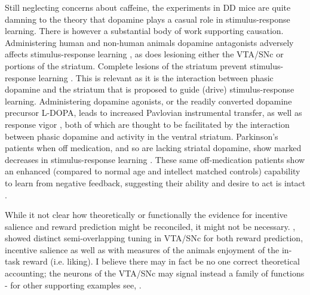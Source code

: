 \documentclass[doc,12pt]{apa}        %
\begin{document}
Still neglecting concerns about caffeine, the experiments in DD mice are quite damning to the theory that dopamine plays a casual role in stimulus-response learning.  There is however a substantial body of work supporting causation.  Administering human and non-human animals dopamine antagonists adversely affects stimulus-response learning \cite{Pizzagalli:2010p7205}, as does lesioning either the VTA/SNc or portions of the striatum.  Complete lesions of the striatum prevent stimulus-response learning \cite{Packard:2002p5074}.  This is relevant as it is the interaction between phasic dopamine and the striatum that is proposed to guide (drive) stimulus-response learning. Administering dopamine agonists, or the readily converted dopamine precursor L-DOPA, leads to increased Pavlovian instrumental transfer, as well as response vigor \cite{Winterbauer:2007p6352}, both of which are thought to be facilitated by the interaction between phasic dopamine and activity in the ventral striatum.  Parkinson's patients when off medication, and so are lacking striatal dopamine, show marked decreases in stimulus-response learning \cite{Pizzagalli:2010p7205}.  These same off-medication patients show an enhanced (compared to normal age and intellect matched controls) capability to learn from negative feedback, suggesting their ability and desire to act is intact \cite{Frank:2004p4709}.

While it not clear how theoretically or functionally the evidence for incentive salience and reward prediction might be reconciled, it might not be necessary.  , showed distinct semi-overlapping tuning in VTA/SNc for both reward prediction, incentive salience as well as with measures of the animals enjoyment of the in-task reward (i.e. liking).  I believe there may in fact be no one correct theoretical accounting; the neurons of the VTA/SNc may signal instead a family of functions - for other supporting examples see, .


\end{document}
